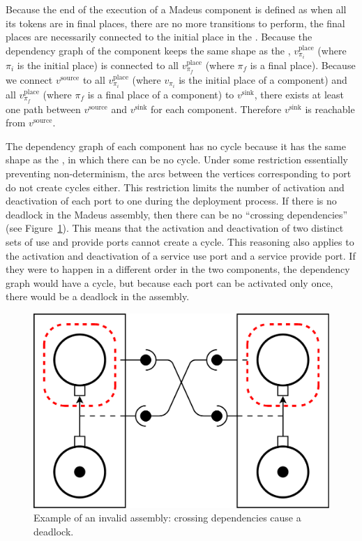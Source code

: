 Because the end of the execution of a Madeus component is defined as
when all its tokens are in final places, \ie there are no more transitions
to perform, the final places are necessarily connected to the initial place
in the \net. Because the dependency graph of the component keeps the same
shape as the \net, $v_{\pi_i}^\text{place}$ (where $\pi_i$ is the initial
place) is connected to all $v_{\pi_f}^\text{place}$ (where $\pi_f$ is a
final place). Because we connect $v^\text{source}$ to all
$v_{\pi_i}^\text{place}$ (where $v_{\pi_i}$ is the initial place of a
component) and all $v_{\pi_f}^\text{place}$ (where $\pi_f$ is a final place
of a component) to $v^\text{sink}$, there exists at least one path between
$v^\text{source}$ and $v^\text{sink}$ for each component. Therefore
$v^\text{sink}$ is reachable from $v^\text{source}$.

The dependency graph of each component has no cycle because it has the same
shape as the \net, in which there can be no cycle. Under some restriction
essentially preventing non-determinism, the arcs between the vertices
corresponding to port do not create cycles either. This restriction limits
the number of activation and deactivation of each port to one during the
deployment process. If there is no deadlock in the Madeus assembly, then
there can be no ``crossing dependencies'' (see Figure~\ref{fig:deadlock}). This means that
the activation and deactivation of two distinct sets of use and provide
ports cannot create a cycle. This reasoning also applies to the activation
and deactivation of a service use port and a service provide port. If they
were to happen in a different order in the two components, the dependency
graph would have a cycle, but because each port can be activated only once,
there would be a deadlock in the assembly.

\begin{figure}[h]
  \begin{center}
    \includegraphics[width=0.7\linewidth]{./images/deadlock.pdf}
  \end{center}
  \caption{Example of an invalid assembly: crossing dependencies cause a deadlock.}
  \label{fig:deadlock}
\end{figure}

